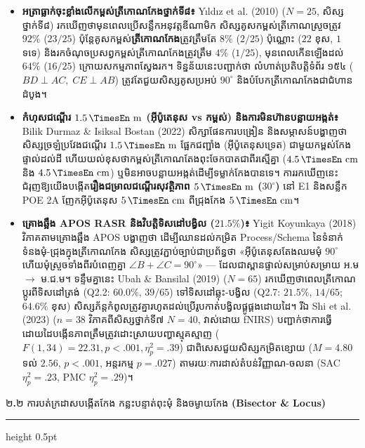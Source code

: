 \documentclass[a4paper,12pt]{article}
\newcommand{\en}[1]{{\TimesEn #1}}
\newcommand{\enbf}[1]{{\TimesEn\textbf{#1}}}
\newcommand{\unit}[1]{\,\text{\en{#1}}}
\newcommand{\ang}[1]{\ensuremath{\angle #1}}
\newcommand{\subsectitle}[1]{{\muol\fontsize{11pt}{14.5pt}\selectfont #1}}
\newcommand{\subsec}[1]{%
  \needspace{1.6cm}%
  \vspace{4pt}%
  \subsectitle{#1}\par
  \vspace{2pt}\hrule height 0.5pt\vspace{3pt}%
}
\begin{document}
\begin{itemize}[leftmargin=0.50cm, topsep=2pt, itemsep=2.5pt, parsep=0pt]
  \item \textbf{អត្រាធ្លាក់ចុះខ្លាំងលើកម្ពស់ត្រីកោណកែងថ្នាក់ទី៨៖} \en{Y\i ld\i z et al. (2010)} ($N=25$, សិស្សថ្នាក់ទី៨) រកឃើញថាមុនពេលប្រើសន្លឹកអនុវត្តឌីណាមិក សិស្សគូសកម្ពស់ត្រីកោណស្រួចត្រូវ \textbf{$92\%$} ($23/25$) ប៉ុន្តែគូសកម្ពស់\textbf{ត្រីកោណកែង}ត្រូវត្រឹមតែ \textbf{$8\%$} ($2/25$) ប៉ុណ្ណោះ ($22$ ខុស, $1$ ទទេ) និងរកចំណុចប្រសព្វកម្ពស់ត្រីកោណកែងត្រូវត្រឹម $4\%$ ($1/25$), មុនពេលកើនឡើងដល់ \textbf{$64\%$} ($16/25$) ក្រោយសកម្មភាពស្វែងរក។ ទិន្នន័យនេះបញ្ជាក់ថា លំហាត់ប្រតិបត្តិទំព័រ ១៥៤ ($BD\perp AC,\allowbreak\; CE\perp AB$) ត្រូវតែជួយសិស្សគូសប្រអប់ $90^\circ$ និងបំបែកត្រីកោណកែងជាជំហានដំបូង។
  \item \textbf{កំហុសជណ្ដើរ $1.5\unit{m}$ (អ៊ីប៉ូតេនុស vs កម្ពស់) និងការមិនហ៊ានបន្លាយអង្កត់៖} \en{Bilik Durmaz \& Isiksal Bostan (2022)} សិក្សាផែនការបង្រៀន និងសម្ភាសន៍បង្ហាញថា សិស្សច្រឡំប្រវែងជណ្ដើរ $1.5\unit{m}$ ផ្អែកជញ្ជាំង (អ៊ីប៉ូតេនុសទ្រេត) ជាមួយកម្ពស់កែងផ្ទាល់ដល់ដី ហើយយល់ខុសថាកម្ពស់ត្រីកោណតែងពុះចែកបាតជាពីរស្មើគ្នា ($4.5\unit{cm}$ និង $4.5\unit{cm}$) ឬមិនអាចបន្លាយអង្កត់ដើម្បីទម្លាក់កែងបានទេ។ ការរកឃើញនេះជំរុញឱ្យយើងបង្កើត\textbf{រឿងជម្រាលជណ្ដើរសុវត្ថិភាព $5\unit{m}$ ($30^\circ$)} នៅ \en{E1} និងសន្លឹក \en{POE 2A} ញែកអ៊ីប៉ូតេនុស $5\unit{cm}$ ពីជ្រុងកែង $5\unit{cm}$។
  \item \textbf{គ្រោងឆ្អឹង \en{APOS RASR} និងវិបត្តិទិសដៅបង្វិល ($21.5\%$)៖} \en{Yigit Koyunkaya (2018)} វិភាគតាមគ្រោងឆ្អឹង \en{APOS} បង្ហាញថា ដើម្បីឈានដល់កម្រិត \en{Process/Schema} នៃទំនាក់ទំនងមុំ-ជ្រុងក្នុងត្រីកោណកែង សិស្សត្រូវភ្ជាប់ច្បាប់ជាប្រព័ន្ធថា «អ៊ីប៉ូតេនុសតែងឈមមុំ $90^\circ$ ហើយមុំស្រួចទាំងពីរបំពេញគ្នា $\ang{B}+\ang{C}=90^\circ$» — ដែលជាស្ពានផ្ទាល់សម្រាប់សម្រាយ អ.ម $\to$ ម.ជ.ម។ ទន្ទឹមគ្នានេះ \en{Ubah \& Bansilal (2019)} ($N=65$) រកឃើញថាពេលត្រីកោណប្តូរពីទិសដៅត្រង់ (\en{Q2.2}: $60.0\%$, $39/65$) ទៅទិសដៅឆ្លុះ-បង្វិល (\en{Q2.7}: $21.5\%$, $14/65$; $64.6\%$ ខុស) សិស្សភ័ន្តកំពូលត្រូវគ្នារហូតដល់ប្រើរូបកាត់បង្វិលផ្គូផ្គងដោយដៃ។ រីឯ \en{Shi et al. (2023)} ($n=38$ វិភាគពីសិស្សថ្នាក់ទី៧ $N=40$, វាស់ដោយ \en{fNIRS}) បញ្ជាក់ថាការធ្វើដោយដៃបង្កើនភាពត្រឹមត្រូវដោះស្រាយបញ្ហាស្មុគស្មាញ ($F(1,34)=22.31, p<.001, \eta^2_p=.39$) ជាពិសេសជួយសិស្សកម្រិតខ្សោយ ($M=4.80$ ទល់ $2.56$, $p<.001$, អន្តរកម្ម $p=.027$) តាមរយៈការដាស់តំបន់វិញ្ញាណ-ចលនា (\en{SAC} $\eta^2_p=.23$, \en{PMC} $\eta^2_p=.29$)។
\end{itemize}

\subsec{២\enbf{.}២ ការបត់ក្រដាសបង្កើតកែង កន្លះបន្ទាត់ពុះមុំ និងចម្ងាយកែង \enbf{(Bisector \& Locus)}}
\end{document}

